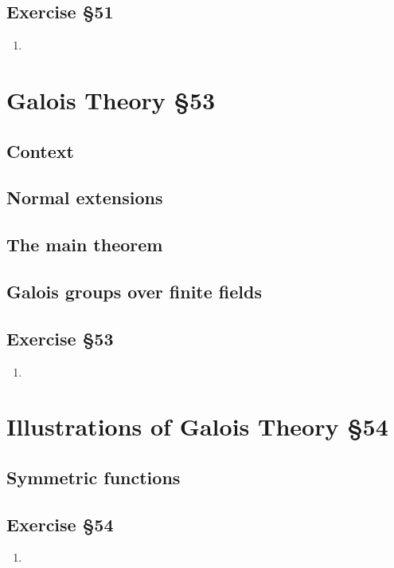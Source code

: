 \subsection{Exercise \S51}
\begin{enumerate}
	\item
\end{enumerate}

\section{Galois Theory \S53}
\subsection{Context}
\subsection{Normal extensions}
\subsection{The main theorem}
\subsection{Galois groups over finite fields}
\subsection{Exercise \S53}
\begin{enumerate}
	\item
\end{enumerate}

\section{Illustrations of Galois Theory \S54}
\subsection{Symmetric functions}
\subsection{Exercise \S54}
\begin{enumerate}
	\item
\end{enumerate}

